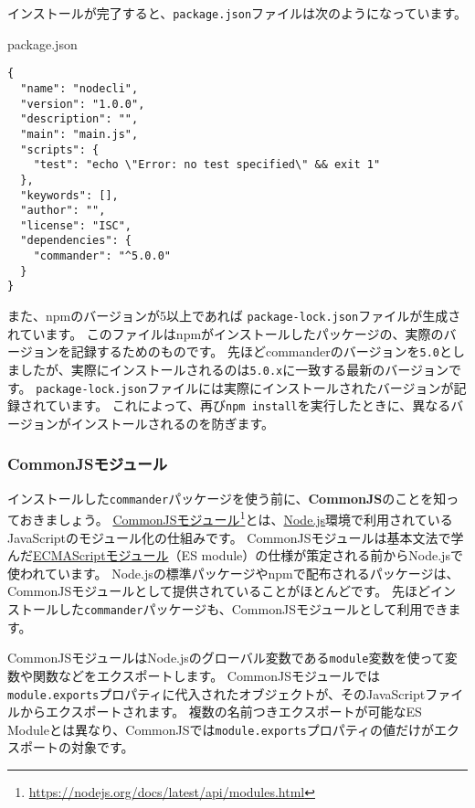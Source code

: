 インストールが完了すると、\texttt{package.json}ファイルは次のようになっています。

\begin{listtitle}
package.json
\end{listtitle}
\begin{lstlisting}
{
  "name": "nodecli",
  "version": "1.0.0",
  "description": "",
  "main": "main.js",
  "scripts": {
    "test": "echo \"Error: no test specified\" && exit 1"
  },
  "keywords": [],
  "author": "",
  "license": "ISC",
  "dependencies": {
    "commander": "^5.0.0"
  }
}
\end{lstlisting}
\listend

また、npmのバージョンが5以上であれば
\texttt{package-lock.json}ファイルが生成されています。
このファイルはnpmがインストールしたパッケージの、実際のバージョンを記録するためのものです。
先ほどcommanderのバージョンを\texttt{5.0}としましたが、実際にインストールされるのは\texttt{5.0.x}に一致する最新のバージョンです。
\texttt{package-lock.json}ファイルには実際にインストールされたバージョンが記録されています。
これによって、再び\texttt{npm install}を実行したときに、異なるバージョンがインストールされるのを防ぎます。

\hypertarget{commonjs-module}{%
\subsubsection{CommonJSモジュール}\label{commonjs-module}}

インストールした\texttt{commander}パッケージを使う前に、\textbf{CommonJS}のことを知っておきましょう。
\href{https://nodejs.org/docs/latest/api/modules.html}{CommonJSモジュール}\footnote{\url{https://nodejs.org/docs/latest/api/modules.html}}とは、\href{https://nodejs.org/ja/}{Node.js}環境で利用されているJavaScriptのモジュール化の仕組みです。
CommonJSモジュールは基本文法で学んだ\hyperlink{module}{ECMAScriptモジュール}（ES module）の仕様が策定される前からNode.jsで使われています。
Node.jsの標準パッケージやnpmで配布されるパッケージは、CommonJSモジュールとして提供されていることがほとんどです。
先ほどインストールした\texttt{commander}パッケージも、CommonJSモジュールとして利用できます。

CommonJSモジュールはNode.jsのグローバル変数である\texttt{module}変数を使って変数や関数などをエクスポートします。
CommonJSモジュールでは\texttt{module.exports}プロパティに代入されたオブジェクトが、そのJavaScriptファイルからエクスポートされます。
複数の名前つきエクスポートが可能なES
Moduleとは異なり、CommonJSでは\texttt{module.exports}プロパティの値だけがエクスポートの対象です。


